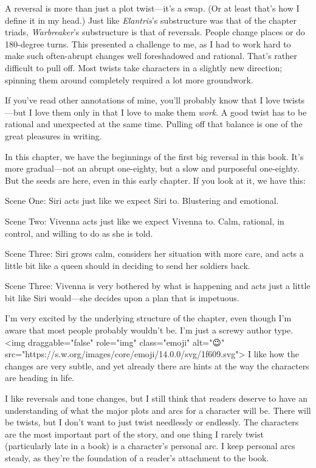 A reversal is more than just a plot twist—it’s a swap. (Or at least that’s how I define it in my head.) Just like \textit{Elantris}’s substructure was that of the chapter triads, \textit{Warbreaker}’s substructure is that of reversals. People change places or do 180-degree turns. This presented a challenge to me, as I had to work hard to make such often-abrupt changes well foreshadowed and rational. That’s rather difficult to pull off. Most twists take characters in a slightly new direction; spinning them around completely required a lot more groundwork.

If you’ve read other annotations of mine, you’ll probably know that I love twists—but I love them only in that I love to make them \textit{work}. A good twist has to be rational and unexpected at the same time. Pulling off that balance is one of the great pleasures in writing.

In this chapter, we have the beginnings of the first big reversal in this book. It’s more gradual—not an abrupt one-eighty, but a slow and purposeful one-eighty. But the seeds are here, even in this early chapter. If you look at it, we have this:

Scene One: Siri acts just like we expect Siri to. Blustering and emotional.

Scene Two: Vivenna acts just like we expect Vivenna to. Calm, rational, in control, and willing to do as she is told.

Scene Three: Siri grows calm, considers her situation with more care, and acts a little bit like a queen should in deciding to send her soldiers back.

Scene Three: Vivenna is very bothered by what is happening and acts just a little bit like Siri would—she decides upon a plan that is impetuous.

I’m very excited by the underlying structure of the chapter, even though I’m aware that most people probably wouldn’t be. I’m just a screwy author type. <img draggable="false" role="img" class="emoji" alt="😉" src="https://s.w.org/images/core/emoji/14.0.0/svg/1f609.svg"> I like how the changes are very subtle, and yet already there are hints at the way the characters are heading in life.

I like reversals and tone changes, but I still think that readers deserve to have an understanding of what the major plots and arcs for a character will be. There will be twists, but I don’t want to just twist needlessly or endlessly. The characters are the most important part of the story, and one thing I rarely twist (particularly late in a book) is a character’s personal arc. I keep personal arcs steady, as they’re the foundation of a reader’s attachment to the book.



